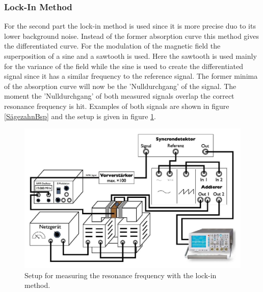 \subsubsection{Lock-In Method}
For the second part the lock-in method is used since it is more precise duo to its lower background noise. Instead of the former absorption curve this method gives the differentiated curve. For the modulation of the magnetic field the superposition of a sine and a sawtooth is used. Here the sawtooth is used mainly for the variance of the field while the sine is used to create the differentiated signal since it has a similar frequency to the reference signal. The former minima of the absorption curve will now be the 'Nulldurchgang' of the signal. The moment the 'Nulldurchgang' of both measured signals overlap the correct resonance frequency is hit. Examples of both signals are shown in figure \ref{SägezahnBsp} and the setup is given in figure \ref{Exp_part2}.
\begin{figure}[h]
	\includegraphics[scale=1]{Bild/Setup2}
	\centering
	\caption[Block Diagram for Setup 2]{Setup for measuring the resonance frequency with the lock-in method.}
	\label{Exp_part2}
\end{figure}

